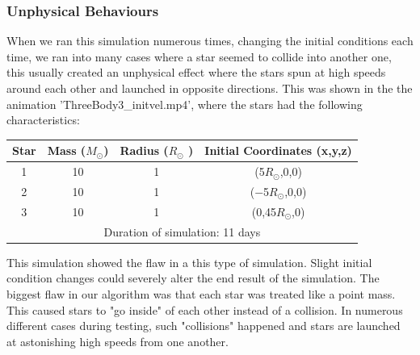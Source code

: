 \documentclass[10pt,letterpaper]{article}
\begin{document}
\subsubsection{Unphysical Behaviours}
When we ran this simulation numerous times, changing the initial conditions each time, we ran into many cases where a star seemed to collide into another one, this usually created an unphysical effect where the stars spun at high speeds around each other and launched in opposite directions. This was shown in the the animation 'ThreeBody3\_initvel.mp4', where the stars had the following characteristics:
\begin{table}[!htb]
\centering
\begin{tabular}{| c | c | c | c |}
\hline
Star & Mass ($M_{\odot}$) & Radius ($R_{\odot}$ ) & Initial Coordinates (x,y,z)\\
\hline
1 & 10 & 1 & (5$R_{\odot}$,0,0) \\
\hline
2 & 10 & 1 & ($-$5$R_{\odot}$,0,0) \\
\hline 
3 & 10 & 1 & (0,45$R_{\odot}$,0) \\
\hline
\multicolumn{4}{|c|}{Duration of simulation: 11 days} \\
\hline
\end{tabular}
\end{table}
This simulation showed the flaw in a this type of simulation. Slight initial condition changes could severely alter the end result of the simulation. The biggest flaw in our algorithm was that each star was treated like a point mass. This caused stars to "go inside" of each other instead of a collision. In numerous different cases during testing, such "collisions" happened and stars are launched at astonishing high speeds from one another. 
\end{document}

